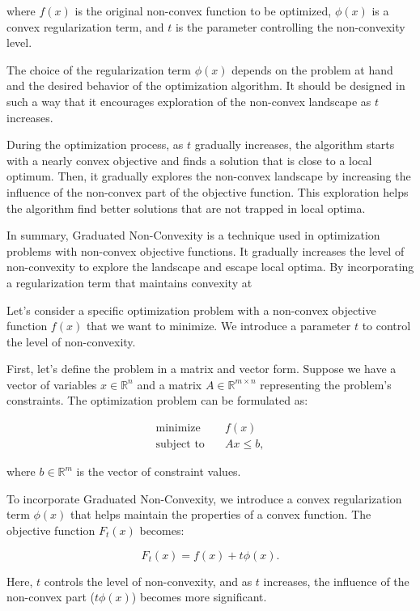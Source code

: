 where $f(x)$ is the original non-convex function to be optimized, $\phi(x)$ is a convex regularization term, and $t$ is the parameter controlling the non-convexity level.

The choice of the regularization term $\phi(x)$ depends on the problem at hand and the desired behavior of the optimization algorithm. It should be designed in such a way that it encourages exploration of the non-convex landscape as $t$ increases.

During the optimization process, as $t$ gradually increases, the algorithm starts with a nearly convex objective and finds a solution that is close to a local optimum. Then, it gradually explores the non-convex landscape by increasing the influence of the non-convex part of the objective function. This exploration helps the algorithm find better solutions that are not trapped in local optima.

In summary, Graduated Non-Convexity is a technique used in optimization problems with non-convex objective functions. It gradually increases the level of non-convexity to explore the landscape and escape local optima. By incorporating a regularization term that maintains convexity at

Let's consider a specific optimization problem with a non-convex objective function $f(x)$ that we want to minimize. We introduce a parameter $t$ to control the level of non-convexity.

First, let's define the problem in a matrix and vector form. Suppose we have a vector of variables $x \in \mathbb{R}^n$ and a matrix $A \in \mathbb{R}^{m \times n}$ representing the problem's constraints. The optimization problem can be formulated as:

\begin{align*}
\text{minimize} & \quad f(x) \\
\text{subject to} & \quad Ax \leq b,
\end{align*}

where $b \in \mathbb{R}^m$ is the vector of constraint values.

To incorporate Graduated Non-Convexity, we introduce a convex regularization term $\phi(x)$ that helps maintain the properties of a convex function. The objective function $F_t(x)$ becomes:

\begin{equation}
	F_t(x) = f(x) + t\phi(x).
\end{equation}


Here, $t$ controls the level of non-convexity, and as $t$ increases, the influence of the non-convex part ($t\phi(x)$) becomes more significant.

